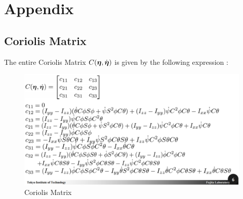 \documentclass{article}
\begin{document}
\newpage


\newpage
\section{Appendix}

\subsection{Coriolis Matrix}
\label{app:coriolis}

The entire Coriolis Matrix $C(\boldsymbol{\eta}, \dot{\boldsymbol{\eta}})$ is given by the following expression \cite{nakano2013quad}:

\begin{figure}[H]
    \centering
    \includegraphics[width=1\textwidth]{figures/cmatrix.png}
    \caption{Coriolis Matrix}
    \label{fig:coriolis}
\end{figure}
\end{document}

